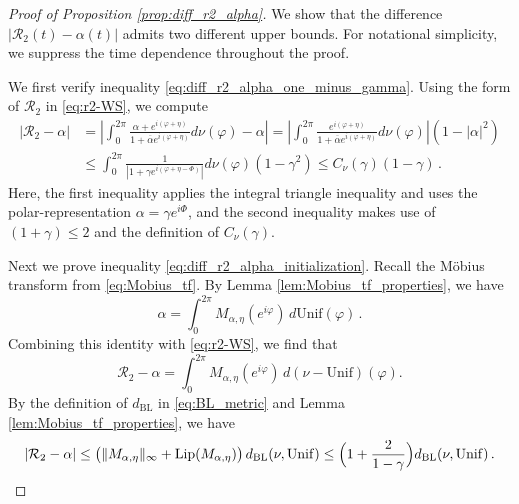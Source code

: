 \documentclass[10pt]{article}
\theoremstyle{definition}
\theoremstyle{definition}
\numberwithin{equation}{section}
\newcommand{\CR}{\mathcal{R}}
\newcommand{\alphaBar}{\overline{\alpha}}
\newcommand{\BL}{\mathrm{BL}}
\newcommand{\Unif}{\mathrm{Unif}}
\begin{document}

\begin{proof}[Proof of Proposition \ref{prop:diff_r2_alpha}]
We show that the difference $|\CR_2(t) - \alpha(t)|$ admits two different upper bounds.
For notational simplicity, we suppress the time dependence throughout the proof.

We first verify inequality \eqref{eq:diff_r2_alpha_one_minus_gamma}.
Using the form of $\CR_2$ in \eqref{eq:r2-WS}, we compute
\begin{equation}\label{eq:diff_r2_alpha_one_minus_gamma_computation}
\begin{aligned}
\left| \CR_2 - \alpha \right| & = \left| \int_0^{2\pi} \frac{\alpha + e^{i(\varphi + \eta)}}{1 + \alphaBar e^{i(\varphi + \eta)}} d\nu(\varphi) - \alpha \right| = \left| \int_0^{2\pi} \frac{e^{i(\varphi + \eta)}}{1 + \alphaBar e^{i(\varphi + \eta)}} d\nu (\varphi) \right| (1 - |\alpha|^2) \\
&\leq \int_0^{2\pi} \frac{1}{|1 + \gamma e^{i(\varphi + \eta - \Phi)}|} d\nu (\varphi) (1 - \gamma^2) \leq C_{\nu}(\gamma) (1-\gamma) \, .
\end{aligned}
\end{equation}
Here, the first inequality applies the integral triangle inequality and uses the polar-representation $\alpha = \gamma e^{i\Phi}$, and the second inequality makes use of $(1+\gamma)\leq 2$ and the definition of $C_{\nu}(\gamma)$. 

Next we prove inequality \eqref{eq:diff_r2_alpha_initialization}.
Recall the Möbius transform from \eqref{eq:Mobius_tf}. 
By Lemma \ref{lem:Mobius_tf_properties}, we have
$$ \alpha =\int_0^{2\pi} M_{\alpha,\eta}(e^{i\varphi})\, d\Unif(\varphi) \, .$$
Combining this identity with \eqref{eq:r2-WS}, we find that
\[
\CR_2-\alpha=\int_0^{2\pi}M_{\alpha,\eta}(e^{i\varphi})\,d(\nu-\Unif)(\varphi).
\]
By the definition of $d_{\BL}$ in \eqref{eq:BL_metric} and Lemma \ref{lem:Mobius_tf_properties}, we have
\[
|\CR_2-\alpha|
\le \bigl(\|M_{\alpha,\eta}\|_\infty+\mathrm{Lip}(M_{\alpha,\eta})\bigr)\, d_{\BL}(\nu,\Unif)
\le \Bigl(1+\frac{2}{1-\gamma}\Bigr)d_{\BL}(\nu,\Unif) \, .
\]
\end{proof}
\end{document}
